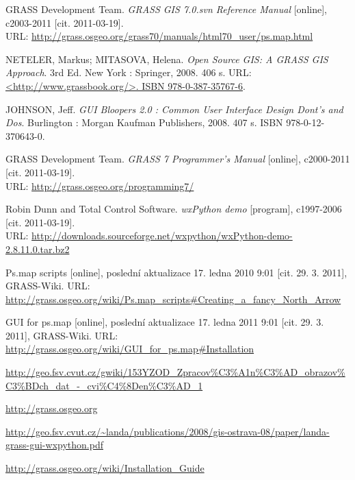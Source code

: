 \documentclass[a4paper,12pt,draft]{article}
\begin{document}
\begin{thebibliography}{9}
\label{literatura}
GRASS Development Team. \textit{GRASS GIS 7.0.svn Reference
Manual} [online], c2003-2011 [cit. 2011-03-19].\\ URL:
\url{http://grass.osgeo.org/grass70/manuals/html70_user/ps.map.html}

NETELER, Markus; MITASOVA, Helena. \textit{Open Source GIS: A
GRASS GIS Approach}. 3rd Ed. New York : Springer, 2008. 406 s. URL:
\url{<http://www.grassbook.org/>. ISBN 978-0-387-35767-6}.

JOHNSON, Jeff. \textit{GUI Bloopers 2.0 : Common User Interface Design
Dont's and Dos}. Burlington : Morgan Kaufman Publishers, 2008. 407 s. ISBN
978-0-12-370643-0.

GRASS Development Team. \textit{GRASS 7 Programmer's Manual} [online],
c2000-2011 [cit. 2011-03-19].\\ URL: \url{http://grass.osgeo.org/programming7/}

Robin Dunn and Total Control Software. \textit{wxPython
demo} [program], c1997-2006 [cit. 2011-03-19].\\ URL:
\url{http://downloads.sourceforge.net/wxpython/wxPython-demo-2.8.11.0.tar.bz2}

Ps.map scripts [online], poslední aktualizace
17. ledna 2010 9:01 [cit. 29. 3. 2011], GRASS-Wiki. URL:
\url{http://grass.osgeo.org/wiki/Ps.map_scripts#Creating_a_fancy_North_Arrow}

GUI for ps.map [online], poslední aktualizace
17. ledna 2011 9:01 [cit. 29. 3. 2011], GRASS-Wiki. URL:
\url{http://grass.osgeo.org/wiki/GUI_for_ps.map#Installation}

 \url{http://geo.fsv.cvut.cz/gwiki/153YZOD_Zpracov%C3%A1n%C3%AD_obrazov%C3%BDch_dat_-_cvi%C4%8Den%C3%AD_1}

\url{http://grass.osgeo.org}

\url{http://geo.fsv.cvut.cz/~landa/publications/2008/gis-ostrava-08/paper/landa-grass-gui-wxpython.pdf}
%

\url{http://grass.osgeo.org/wiki/Installation_Guide}



\end{thebibliography}
\end{document}
